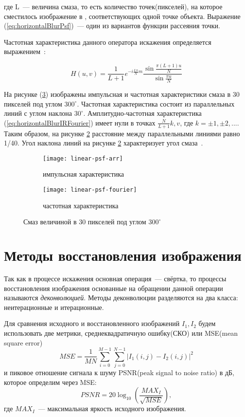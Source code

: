 где L~--- величина смаза, то есть количество точек(пикселей), на которое сместилось изображение в , соответствующих одной точке объекта. Выражение (\ref{eq:horizontalBlurPsf})~--- один из вариантов функции рассеяния точки.

Частотная характеристика данного оператора искажения определяется выражением~\cite{iterableImageRestorationBiemonLangdeik}:

\begin{equation}\label{eq:horizontalBlurIRFourier}
H(u,v) =       
	\frac{1}{L+1}e^{-i\frac{L\pi}{N}m}\frac{\sin\frac{\pi(L+1)u}{N}}{\sin\frac{\pi u}{N}}
\end{equation}

На рисунке (\ref{fig:linearPsf}) изображены импульсная и частотная характеристики смаза в 30 пикселей под углом $300^\circ$. Частотная характеристика состоит из параллельных линий с углом наклона $30^\circ$. Амплитудно-частотная характеристика (\ref{eq:horizontalBlurIRFourier}) имеет нули в точках $\frac{N}{L+1}k, v$, где $k = \pm 1, \pm2, ...$. Таким образом, на рисунке \ref{fig:linearPsfFourier} расстояние между параллельными линиями равно 1/40. Угол наклона линий на рисунке \ref{fig:linearPsfFourier} характеризует угол смаза~\cite{iterableImageRestorationBiemonLangdeik}.
\begin{figure}[h!]
	\begin{subfigure}[b]{0.5\textwidth}
		\texttt{[image: linear-psf-arr]}
		\caption{импульсная характеристика}
		\label{fig:linearPsfArr}
	\end{subfigure}%
	\begin{subfigure}[b]{0.5\textwidth}
		\texttt{[image: linear-psf-fourier]}%
		\caption{частотная характеристика}
		\label{fig:linearPsfFourier}
	\end{subfigure}%
	\caption{Смаз величиной в 30 пикселей под углом $300^{\circ}$}\label{fig:linearPsf}
\end{figure}

\section{Методы восстановления изображения}
Так как в процессе искажения основная операция~--- свёртка, то процессы восстановления изображения основанные на обращении данной операции называются \textit{деконволюцией}. Методы деконволюции разделяются на два класса: неитерационные и итерационные.

Для сравнения исходного и восстановленного изображений $I_1, I_2$ будем использовать две метрики, среднеквадратичную ошибку(СКО) или MSE(mean square error)
\begin{equation}\label{eq:mse}
MSE = \frac{1}{MN}\sum_{i=0}^{M-1}\sum_{j=0}^{N-1}\left| I_1(i,j)-I_2(i,j)\right|^2
\end{equation}
и пиковое отношение сигнала к шуму PSNR(peak signal to noise ratio) в дБ, которое определим через MSE: 
\begin{equation}\label{eq:psnr}
PSNR = 20\log_{10}\left(\frac{MAX_I}{\sqrt{MSE}}\right),
\end{equation}
где $MAX_I$~--- максимальная яркость исходного изображения.

